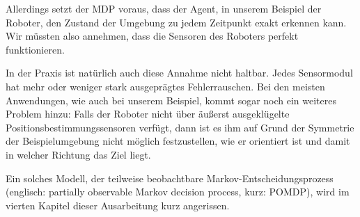\documentclass[a4paper]{IEEEtran}
\begin{document}
Allerdings setzt der MDP voraus, dass der Agent, in unserem Beispiel der Roboter, den Zustand der Umgebung zu jedem Zeitpunkt exakt erkennen kann. Wir müssten also annehmen, dass die Sensoren des Roboters perfekt funktionieren.

In der Praxis ist natürlich auch diese Annahme nicht haltbar. Jedes Sensormodul hat mehr oder weniger stark ausgeprägtes Fehlerrauschen. Bei den meisten Anwendungen, wie auch bei unserem Beispiel, kommt sogar noch ein weiteres Problem hinzu: Falls der Roboter nicht über äußerst ausgeklügelte Positionsbestimmungssensoren verfügt, dann ist es ihm auf Grund der Symmetrie der Beispielumgebung nicht möglich festzustellen, wie er orientiert ist und damit in welcher Richtung das Ziel liegt.

Ein solches Modell, der teilweise beobachtbare Markov-Entscheidungsprozess (englisch: partially observable Markov decision process, kurz: POMDP), wird im vierten Kapitel dieser Ausarbeitung kurz angerissen.
\end{document}
